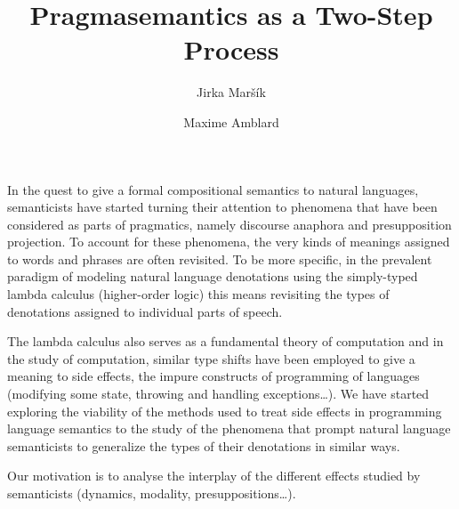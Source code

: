 \documentclass[a4paper,11pt]{article}
\title{Pragmasemantics as a Two-Step Process}
\author{Jirka Maršík \and Maxime Amblard}
\begin{document}
\maketitle


In the quest to give a formal compositional semantics to natural languages,
semanticists have started turning their attention to phenomena that have
been considered as parts of pragmatics, namely discourse anaphora and
presupposition projection. To account for these phenomena, the very kinds
of meanings assigned to words and phrases are often revisited. To be more
specific, in the prevalent paradigm of modeling natural language
denotations using the simply-typed lambda calculus (higher-order logic)
this means revisiting the types of denotations assigned to individual parts
of speech.

The lambda calculus also serves as a fundamental theory of computation and
in the study of computation, similar type shifts have been employed to give
a meaning to side effects, the impure constructs of programming of
languages (modifying some state, throwing and handling
exceptions\ldots). We have started exploring the viability of the methods
used to treat side effects in programming language semantics to the study
of the phenomena that prompt natural language semanticists to generalize
the types of their denotations in similar ways.

Our motivation is to analyse the interplay of the different effects studied
by semanticists (dynamics, modality, presuppositions\ldots). 




\end{document}
